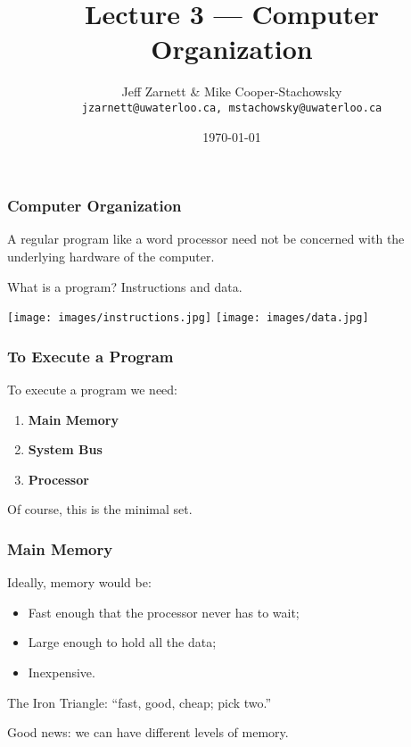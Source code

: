 

\title{Lecture 3 --- Computer Organization}

\author{Jeff Zarnett \& Mike Cooper-Stachowsky \\ \small \texttt{jzarnett@uwaterloo.ca, mstachowsky@uwaterloo.ca}}
\date{\today}



\begin{frame}
  \titlepage

 \end{frame}

\begin{frame}
\frametitle{Computer Organization}

A regular program like a word processor need not be concerned with the underlying hardware of the computer.

What is a program? Instructions and data.
\begin{center}
	\texttt{[image: images/instructions.jpg]}
	\texttt{[image: images/data.jpg]}
\end{center}


\end{frame}

\begin{frame}
\frametitle{To Execute a Program}

To execute a program we need:

\begin{enumerate}
	\item \textbf{Main Memory}
	\item \textbf{System Bus}
	\item \textbf{Processor}
\end{enumerate}

Of course, this is the minimal set.

\end{frame}

\begin{frame}
\frametitle{Main Memory}
Ideally, memory would be:

\begin{itemize}
	\item Fast enough that the processor never has to wait;
	\item Large enough to hold all the data;
	\item Inexpensive.
\end{itemize}

The \alert{Iron Triangle}: ``fast, good, cheap; pick two.''

Good news: we can have different levels of memory.

\end{frame}

